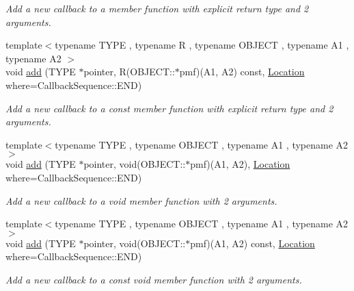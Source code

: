 \begin{DoxyCompactItemize}
\begin{DoxyCompactList}\small\item\em Add a new callback to a member function with explicit return type and 2 arguments. \item\end{DoxyCompactList}\item 
{\footnotesize template$<$typename TYPE , typename R , typename OBJECT , typename A1 , typename A2 $>$ }\\void \hyperlink{struct_d_d4hep_1_1_callback_sequence_a176f9409cc71b2811746680da84989ce}{add} (TYPE $\ast$pointer, R(OBJECT::$\ast$pmf)(A1, A2) const, \hyperlink{struct_d_d4hep_1_1_callback_sequence_a7753490247479633aed16a2376821ef7}{Location} where=CallbackSequence::END)
\begin{DoxyCompactList}\small\item\em Add a new callback to a const member function with explicit return type and 2 arguments. \item\end{DoxyCompactList}\item 
{\footnotesize template$<$typename TYPE , typename OBJECT , typename A1 , typename A2 $>$ }\\void \hyperlink{struct_d_d4hep_1_1_callback_sequence_a2eb666ee1a72d56de7100f8fd8742626}{add} (TYPE $\ast$pointer, void(OBJECT::$\ast$pmf)(A1, A2), \hyperlink{struct_d_d4hep_1_1_callback_sequence_a7753490247479633aed16a2376821ef7}{Location} where=CallbackSequence::END)
\begin{DoxyCompactList}\small\item\em Add a new callback to a void member function with 2 arguments. \item\end{DoxyCompactList}\item 
{\footnotesize template$<$typename TYPE , typename OBJECT , typename A1 , typename A2 $>$ }\\void \hyperlink{struct_d_d4hep_1_1_callback_sequence_a2a10a126c6b2c0ab9ae1c5925b72b615}{add} (TYPE $\ast$pointer, void(OBJECT::$\ast$pmf)(A1, A2) const, \hyperlink{struct_d_d4hep_1_1_callback_sequence_a7753490247479633aed16a2376821ef7}{Location} where=CallbackSequence::END)
\begin{DoxyCompactList}\small\item\em Add a new callback to a const void member function with 2 arguments. \item\end{DoxyCompactList}\end{DoxyCompactItemize}
